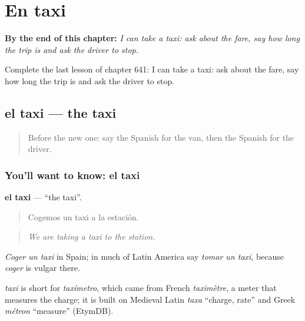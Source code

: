 
\chapter{En taxi}
\label{ch:es-en-taxi}

\begin{chapteropening}
\textbf{By the end of this chapter:} \emph{I can take a taxi: ask about the fare, say how long the trip is and ask the driver to stop.}

Complete the last lesson of chapter 641: I can take a taxi: ask about the fare, say how long the trip is and ask the driver to stop.
\end{chapteropening}

\section[el taxi]{el taxi — the taxi}

\label{lesson:ES-C641-taxi}



\begin{quote}
Before the new one: say the Spanish for the van, then the Spanish for the driver.
\end{quote}

\subsection*{You'll want to know: el taxi}
\textbf{el taxi} — \textquotedblleft{}the taxi\textquotedblright{}.

\begin{quote}
Cogemos un taxi a la estación.
\end{quote}

\begin{quote}
\emph{We are taking a taxi to the station.}
\end{quote}

\emph{Coger un taxi} in Spain; in much of Latin America say \emph{tomar un taxi}, because \emph{coger} is vulgar there.

\begin{cousinweb}
\emph{taxi} is short for \emph{taxímetro}, which came from French \emph{taximètre}, a meter that measures the charge; it is built on Medieval Latin \emph{taxa} \textquotedblleft{}charge, rate\textquotedblright{} and Greek \emph{métron} \textquotedblleft{}measure\textquotedblright{} (EtymDB).
\end{cousinweb}

